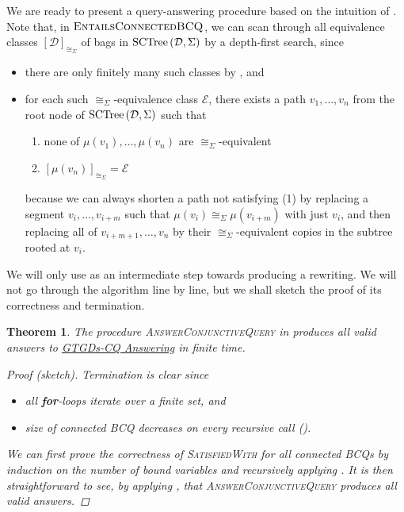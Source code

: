 \documentclass[12pt]{report}
\theoremstyle{plain}
\newtheorem{theorem}{Theorem}[chapter]
\theoremstyle{definition}
\newcommand{\SCTree}[2]{\ensuremath{\normalfont{\textrm{SCTree}} \left( #1, #2 \right)}}
\begin{document}
We are ready to present a query-answering procedure  based on the intuition of . Note that, in $\textsc{EntailsConnectedBCQ}$, we can scan through all equivalence classes $[\mathcal{D}]_{\cong_\Sigma}$ of bags in $\SCTree{\mathcal{D}}{\Sigma}$ by a depth-first search, since
\begin{itemize}
  \item there are only finitely many such classes by , and
  \item for each such $\cong_\Sigma$-equivalence class $\mathcal{E}$, there exists a path $v_1, \ldots, v_n$ from the root node of $\SCTree{\mathcal{D}}{\Sigma}$ such that
  \begin{enumerate}
    \item none of $\mu(v_1), \ldots, \mu(v_n)$ are $\cong_\Sigma$-equivalent
    \item $[\mu(v_n)]_{\cong_\Sigma} = \mathcal{E}$
  \end{enumerate}
  because we can always shorten a path not satisfying (1) by replacing a segment $v_i, \ldots, v_{i+m}$ such that $\mu(v_i) \cong_\Sigma \mu(v_{i+m})$ with just $v_i$, and then replacing all of $v_{i+m+1}, \ldots, v_n$ by their $\cong_\Sigma$-equivalent copies in the subtree rooted at $v_i$.
\end{itemize}

We will only use  as an intermediate step towards producing a rewriting. We will not go through the algorithm line by line, but we shall sketch the proof of its correctness and termination.

\begin{theorem}
  The procedure \textsc{AnswerConjunctiveQuery} in  produces all valid answers to \hyperref[GTGDs-CQ-Answering]{GTGDs-CQ Answering} in finite time.
  \begin{proof}[Proof (sketch)]
    Termination is clear since
    \begin{itemize}
      \item all \textbf{for}-loops iterate over a finite set, and
      \item size of connected BCQ decreases on every recursive call ().
    \end{itemize}

    We can first prove the correctness of \textsc{SatisfiedWith} for all connected BCQs by induction on the number of bound variables and recursively applying . It is then straightforward to see, by applying , that \textsc{AnswerConjunctiveQuery} produces all valid answers.
  \end{proof}
\end{theorem}
\end{document}
